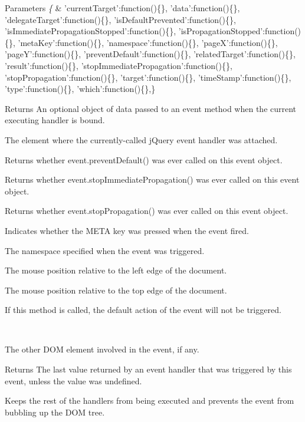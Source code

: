 \begin{DoxyParams}{Parameters}
{\em \{} & 'current\-Target'\-:function()\{\}, 'data'\-:function()\{\}, 'delegate\-Target'\-:function()\{\}, 'is\-Default\-Prevented'\-:function()\{\}, 'is\-Immediate\-Propagation\-Stopped'\-:function()\{\}, 'is\-Propagation\-Stopped'\-:function()\{\}, 'meta\-Key'\-:function()\{\}, 'namespace'\-:function()\{\}, 'page\-X'\-:function()\{\}, 'page\-Y'\-:function()\{\}, 'prevent\-Default'\-:function()\{\}, 'related\-Target'\-:function()\{\}, 'result'\-:function()\{\}, 'stop\-Immediate\-Propagation'\-:function()\{\}, 'stop\-Propagation'\-:function()\{\}, 'target'\-:function()\{\}, 'time\-Stamp'\-:function()\{\}, 'type'\-:function()\{\}, 'which'\-:function()\{\},\} \begin{DoxyReturn}{Returns}
An optional object of data passed to an event method when the current executing handler is bound.

The element where the currently-\/called j\-Query event handler was attached.

Returns whether event.\-prevent\-Default() was ever called on this event object.

Returns whether event.\-stop\-Immediate\-Propagation() was ever called on this event object.

Returns whether event.\-stop\-Propagation() was ever called on this event object.

Indicates whether the M\-E\-T\-A key was pressed when the event fired.

The namespace specified when the event was triggered.

The mouse position relative to the left edge of the document.

The mouse position relative to the top edge of the document.

If this method is called, the default action of the event will not be triggered.
\end{DoxyReturn}
\\
\hline
\end{DoxyParams}
The other D\-O\-M element involved in the event, if any.

\begin{DoxyReturn}{Returns}
The last value returned by an event handler that was triggered by this event, unless the value was undefined.

Keeps the rest of the handlers from being executed and prevents the event from bubbling up the D\-O\-M tree.
\end{DoxyReturn}



